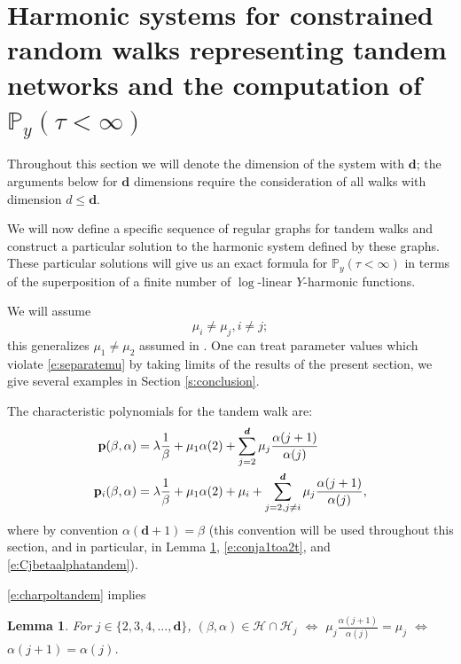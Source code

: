 \documentclass[11pt,a4paper]{article}
\newtheorem{lemma}{Lemma}
\begin{document}
\section{Harmonic systems for constrained random walks representing
tandem networks and the computation of ${\mathbb P}_y(\tau < \infty)$}
\label{s:hstq}
Throughout this section we will denote the dimension of the system
with ${\boldsymbol d}$; the arguments below for
${\boldsymbol d}$ dimensions require the consideration
of all walks with dimension $d \le {\boldsymbol d}$.

We will now define a specific sequence of regular graphs
for tandem walks
and construct a particular solution to the harmonic system defined
by these graphs.
These particular solutions
will give us an exact formula  for ${\mathbb P}_y(\tau < \infty)$ in terms of
the superposition of a finite number of $\log$-linear $Y$-harmonic functions.

We will assume 
\begin{equation}\label{e:separatemu}
\mu_i \neq \mu_j, i \neq j;
\end{equation}
this generalizes $\mu_1 \neq \mu_2$ assumed in \cite{sezer2018approximation}.
One can treat parameter values which violate \eqref{e:separatemu} by taking limits
of the results of the present section, we give several examples in Section \ref{s:conclusion}.


The characteristic polynomials for the tandem walk are:
\begin{align}\label{e:charpoltandem}
{\mathbf p}(\beta,\alpha) &= 
\lambda \frac{1}{\beta} + 
\mu_1 \alpha(2) + \sum_{j=2}^{{\boldsymbol d}} \mu_j\frac{\alpha(j+1)}{\alpha(j)}\\
{\mathbf p}_i(\beta,\alpha) &= 
\lambda \frac{1}{\beta} + 
\mu_1 \alpha(2) + \mu_i +  \sum_{j=2, j \neq i}^{{\boldsymbol d}} \mu_j\frac{\alpha(j+1)}{\alpha(j)},
\notag
\end{align}
where by convention $\alpha({\boldsymbol d}+1) = \beta$ (this convention
will be used throughout this section, and in particular, 
in Lemma \ref{l:conditionforintersection}, \eqref{e:conja1toa2t}, and
\eqref{e:Cjbetaalphatandem}).

\eqref{e:charpoltandem} implies
\begin{lemma}\label{l:conditionforintersection}
For $j \in \{2,3,4,...,{\bm d} \}$,
$(\beta,\alpha) \in {\mathcal H} \cap {\mathcal H}_j$
$\iff$
$\mu_j \frac{\alpha(j+1)}{\alpha(j)} = \mu_j$
$\iff$
$\alpha(j+1) = \alpha(j)$.
\end{lemma}
\end{document}
